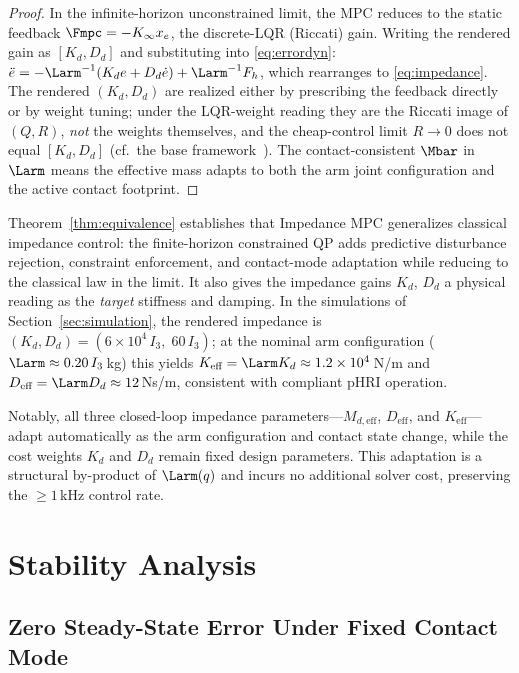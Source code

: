 \begin{proof}
In the infinite-horizon unconstrained limit, the MPC reduces to the static
feedback $\Fmpc=-K_\infty x_e$, the discrete-LQR (Riccati) gain.
Writing the rendered gain as $[K_d,D_d]$ and substituting into
\eqref{eq:errordyn}:
$\ddot{e}=-\Larm^{-1}(K_d e+D_d\dot{e})+\Larm^{-1}F_h$,
which rearranges to \eqref{eq:impedance}.
The rendered $(K_d,D_d)$ are realized either by prescribing the feedback
directly or by weight tuning; under the LQR-weight reading they are the
Riccati image of $(Q,R)$, \emph{not} the weights themselves, and the
cheap-control limit $R\to0$ does not equal $[K_d,D_d]$ (cf.\ the base
framework~\cite{cao2026impedance}).
The contact-consistent $\Mbar$ in $\Larm$ means the effective mass adapts
to both the arm joint configuration and the active contact footprint.
\end{proof}

Theorem~\ref{thm:equivalence} establishes that Impedance MPC generalizes
classical impedance control: the finite-horizon constrained QP adds
predictive disturbance rejection, constraint enforcement, and contact-mode
adaptation while reducing to the classical law in the limit.
It also gives the impedance gains $K_d$, $D_d$ a physical reading as the
\emph{target} stiffness and damping.
In the simulations of Section~\ref{sec:simulation},
the rendered impedance is $(K_d,D_d)=(6\times10^4\,I_3,\;60\,I_3)$; at the
nominal arm configuration ($\Larm\approx0.20\,I_3$\,kg) this yields
$K_{\text{eff}}=\Larm K_d\approx1.2\times10^4$\,N/m and
$D_{\text{eff}}=\Larm D_d\approx12$\,Ns/m, consistent with compliant pHRI
operation.

Notably, all three closed-loop impedance parameters---$M_{d,\text{eff}}$,
$D_{\text{eff}}$, and $K_{\text{eff}}$---adapt automatically as the arm
configuration and contact state change, while the cost weights $K_d$ and
$D_d$ remain fixed design parameters.
This adaptation is a structural by-product of $\Larm(q)$ and incurs no
additional solver cost, preserving the ${\geq}1$\,kHz control rate.

\section{Stability Analysis}\label{sec:stability}

\subsection{Zero Steady-State Error Under Fixed Contact Mode}

